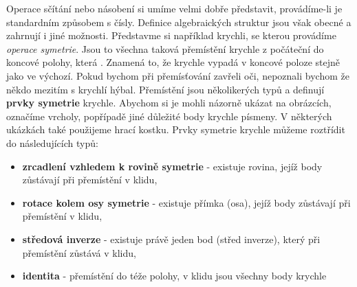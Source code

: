         Operace sčítání nebo násobení si umíme velmi dobře představit, provádíme-li je standardním 
        způsobem s čísly. Definice algebraických struktur jsou však obecné a zahrnují i jiné 
        možnosti. Představme si například krychli, se kterou provádíme \emph{operace symetrie}. 
        Jsou to všechna taková přemístění krychle z počáteční do koncové polohy, která . Znamená to, že krychle vypadá v koncové poloze stejně jako ve výchozí. Pokud
        bychom při přemísťování zavřeli oči, nepoznali bychom že někdo mezitím s krychlí hýbal. 
        Přemístění jsou několikerých typů a definují \textbf{prvky symetrie} krychle. Abychom si je 
        mohli názorně ukázat na obrázcích, označíme vrcholy, popřípadě jiné důležité body krychle 
        písmeny. V některých ukázkách také použijeme hrací kostku. Prvky symetrie krychle můžeme 
        roztřídit do následujících typů:
        \begin{itemize}
          \item \textbf{zrcadlení vzhledem k rovině symetrie} - existuje rovina, jejíž body 
                zůstávají při přemístění v klidu,
          \item \textbf{rotace kolem osy symetrie} - existuje přímka (osa), jejíž body zůstávají 
                při přemístění v klidu,
          \item \textbf{středová inverze} - existuje právě jeden bod (střed inverze), který při 
                přemístění zůstává v klidu,
          \item \textbf{identita} - přemístění do téže polohy, v klidu jsou všechny body krychle
        \end{itemize}
         

\printbibliography[title={Seznam literatury}, heading=subbibliography]
